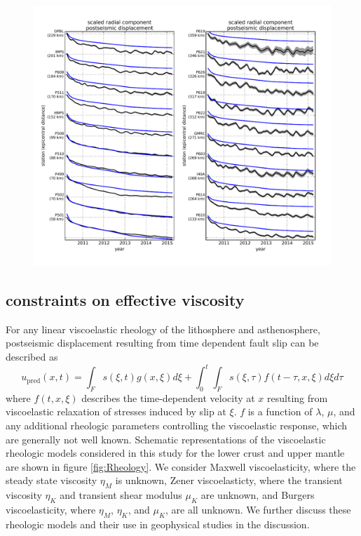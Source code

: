 \documentclass[1p]{elsarticle}
\begin{document}
\begin{figure}
\includegraphics[scale=0.7]{Figures/RecordSectionElastic}
\caption{}
\label{fig:RecordSectionElastic}
\end{figure}

\subsection{constraints on effective viscosity}\label{sec:InitialInversion}


For any linear viscoelastic rheology of the lithosphere and asthenosphere, postseismic displacement resulting from time dependent fault slip can be described as  
\begin{equation}\label{GeneralForward}
  u_\mathrm{pred}(x,t) = \int_F s(\xi,t)g(x,\xi)d\xi + 
           \int_0^t\int_F s(\xi,\tau) f(t-\tau,x,\xi) d\xi d\tau
\end{equation}
where $f(t,x,\xi)$ describes the time-dependent velocity at $x$ resulting from viscoelastic relaxation of stresses induced by slip at $\xi$. $f$ is a function of $\lambda$, $\mu$, and any additional rheologic parameters controlling the viscoelastic response, which are generally not well known. Schematic representations of the viscoelastic rheologic models considered in this study for the lower crust and upper mantle are shown in figure \ref{fig:Rheology}.  We consider Maxwell viscoelasticity, where the steady state viscosity $\eta_M$ is unknown, Zener viscoelasticty, where the transient viscosity $\eta_K$ and transient shear modulus $\mu_K$ are unknown, and Burgers viscoelasticity, where $\eta_M$, $\eta_K$, and $\mu_K$, are all unknown. We further discuss these rheologic models and their use in geophysical studies in the discussion. 
\end{document}
